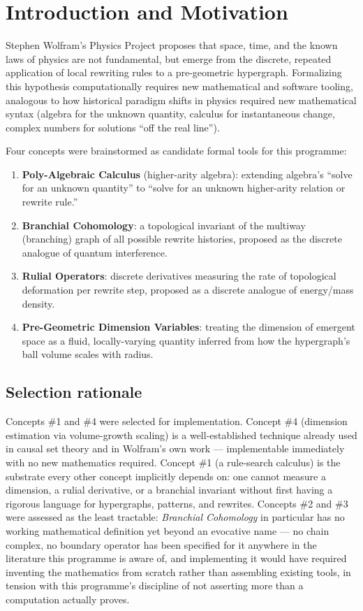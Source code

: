 \documentclass[11pt,a4paper]{article}
\begin{document}
\tableofcontents

\section{Introduction and Motivation}

Stephen Wolfram's Physics Project proposes that space, time, and the known
laws of physics are not fundamental, but emerge from the discrete,
repeated application of local rewriting rules to a pre-geometric
hypergraph. Formalizing this hypothesis computationally requires new
mathematical and software tooling, analogous to how historical paradigm
shifts in physics required new mathematical syntax (algebra for the
unknown quantity, calculus for instantaneous change, complex numbers for
solutions ``off the real line'').

Four concepts were brainstormed as candidate formal tools for this
programme:

\begin{enumerate}
\item \textbf{Poly-Algebraic Calculus} (higher-arity algebra): extending
  algebra's ``solve for an unknown quantity'' to ``solve for an unknown
  higher-arity relation or rewrite rule.''
\item \textbf{Branchial Cohomology}: a topological invariant of the
  multiway (branching) graph of all possible rewrite histories, proposed
  as the discrete analogue of quantum interference.
\item \textbf{Rulial Operators}: discrete derivatives measuring the rate
  of topological deformation per rewrite step, proposed as a discrete
  analogue of energy/mass density.
\item \textbf{Pre-Geometric Dimension Variables}: treating the dimension
  of emergent space as a fluid, locally-varying quantity inferred from how
  the hypergraph's ball volume scales with radius.
\end{enumerate}

\subsection{Selection rationale}

Concepts \#1 and \#4 were selected for implementation. Concept \#4
(dimension estimation via volume-growth scaling) is a well-established
technique already used in causal set theory and in Wolfram's own work ---
implementable immediately with no new mathematics required. Concept \#1
(a rule-search calculus) is the substrate every other concept implicitly
depends on: one cannot measure a dimension, a rulial derivative, or a
branchial invariant without first having a rigorous language for
hypergraphs, patterns, and rewrites. Concepts \#2 and \#3 were assessed as
the least tractable: \emph{Branchial Cohomology} in particular has no
working mathematical definition yet beyond an evocative name --- no chain
complex, no boundary operator has been specified for it anywhere in the
literature this programme is aware of, and implementing it would have
required inventing the mathematics from scratch rather than assembling
existing tools, in tension with this programme's discipline of not
asserting more than a computation actually proves.
\end{document}
